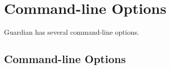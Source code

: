 
\chapter{Command-line Options}
{
	Guardian has several command-line options.
	
	\section{Command-line Options}
	{
		\begin{itemize}
		{
			\item [\texttt{-i <path>}]
			{
				\lipsum[1]
			}
			
			\item [\texttt{-o <path>}]
			{
				\lipsum[1]
			}
			
			\item [\texttt{-m}]
			{
				\lipsum[1]
			}
			
			\item [\texttt{-v}]
			{
				\lipsum[1]
			}
			
			\item [\texttt{-h}]
			{
				\lipsum[1]
			}
		}
		\end{itemize}
	}
}


